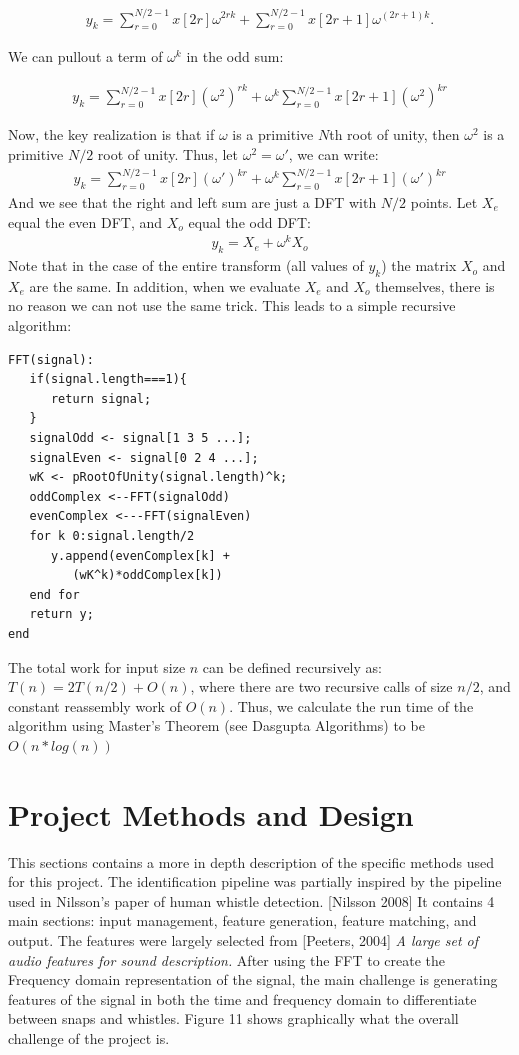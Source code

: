 \documentclass[DIV=calc, paper=a4, fontsize=11pt, twocolumn]{scrartcl}   %
\begin{document}
\begin{align}
y_k = \sum_{r=0}^{N/2-1}x[2r]\omega^{2rk} + \sum_{r=0}^{N/2-1}x[2r+1]\omega^{(2r+1)k}  .
\end{align}

We can pullout a term of $\omega^k$ in the odd sum:

\begin{align}
y_k = \sum_{r=0}^{N/2-1}x[2r](\omega^{2})^{rk} + \omega^k \sum_{r=0}^{N/2-1}x[2r+1](\omega^{2})^{kr}
\end{align}

Now, the key realization is that if $\omega$ is a primitive $N$th root of unity, then $\omega^2$ is a primitive $N/2$ root of unity. Thus, let $\omega^2 = \omega'$, we can write:
\begin{align}
y_k = \sum_{r=0}^{N/2-1}x[2r](\omega')^{kr} + \omega^k \sum_{r=0}^{N/2-1}x[2r+1](\omega')^{kr}
\end{align}
And we see that the right and left sum are just a DFT with $N/2$ points. Let $X_e$ equal the even DFT, and $X_o$ equal the odd DFT:
\begin{align}
y_k = X_e + \omega^k X_o
\end{align}
Note that in the case of the entire transform (all values of $y_k$) the matrix $X_o$ and $X_e$ are the same. In addition, when we evaluate $X_e$ and $X_o$ themselves, there is no reason we can not use the same trick. This leads to a simple recursive algorithm:

\begin{lstlisting}
FFT(signal):
   if(signal.length===1){
      return signal;
   }
   signalOdd <- signal[1 3 5 ...];
   signalEven <- signal[0 2 4 ...];
   wK <- pRootOfUnity(signal.length)^k;
   oddComplex <--FFT(signalOdd)
   evenComplex <---FFT(signalEven)
   for k 0:signal.length/2
      y.append(evenComplex[k] +
         (wK^k)*oddComplex[k])
   end for
   return y;
end
\end{lstlisting}

 The total work for input size $n$ can be defined recursively as: $T(n) = 2T(n/2)+O(n)$, where there are two recursive calls of size $n/2$, and constant reassembly work of $O(n)$. Thus, we calculate the run time of the algorithm using Master's Theorem (see Dasgupta Algorithms) to be $O(n*log(n))$

\section{Project Methods and Design}
   This sections contains a more in depth description of the specific methods used for this project.
   The identification pipeline was partially inspired by the pipeline used in Nilsson's paper of human whistle detection. [Nilsson 2008] It contains 4 main sections: input management, feature generation, feature matching, and output. The features were largely selected from [Peeters, 2004] \textit{A large set of audio features for sound description.} After using the FFT to create the Frequency domain representation of the signal, the main challenge is generating features of the signal in both the time and frequency domain to differentiate between snaps and whistles. Figure 11 shows graphically what the overall challenge of the project is.
\end{document}
